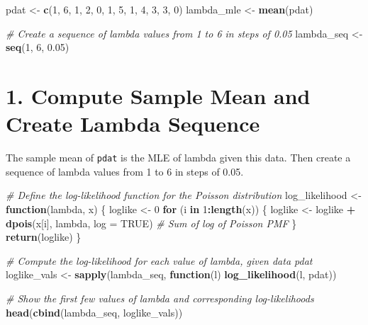 \documentclass[
]{article}
\newenvironment{Shaded}{\begin{snugshade}}{\end{snugshade}}
\newcommand{\AttributeTok}[1]{\textcolor[rgb]{0.13,0.29,0.53}{#1}}
\newcommand{\CommentTok}[1]{\textcolor[rgb]{0.56,0.35,0.01}{\textit{#1}}}
\newcommand{\ConstantTok}[1]{\textcolor[rgb]{0.56,0.35,0.01}{#1}}
\newcommand{\ControlFlowTok}[1]{\textcolor[rgb]{0.13,0.29,0.53}{\textbf{#1}}}
\newcommand{\DecValTok}[1]{\textcolor[rgb]{0.00,0.00,0.81}{#1}}
\newcommand{\FloatTok}[1]{\textcolor[rgb]{0.00,0.00,0.81}{#1}}
\newcommand{\FunctionTok}[1]{\textcolor[rgb]{0.13,0.29,0.53}{\textbf{#1}}}
\newcommand{\NormalTok}[1]{#1}
\newcommand{\OtherTok}[1]{\textcolor[rgb]{0.56,0.35,0.01}{#1}}
\newcommand{\SpecialCharTok}[1]{\textcolor[rgb]{0.81,0.36,0.00}{\textbf{#1}}}
\begin{document}
\begin{Shaded}
\begin{Highlighting}[]
\NormalTok{pdat }\OtherTok{\textless{}{-}} \FunctionTok{c}\NormalTok{(}\DecValTok{1}\NormalTok{, }\DecValTok{6}\NormalTok{, }\DecValTok{1}\NormalTok{, }\DecValTok{2}\NormalTok{, }\DecValTok{0}\NormalTok{, }\DecValTok{1}\NormalTok{, }\DecValTok{5}\NormalTok{, }\DecValTok{1}\NormalTok{, }\DecValTok{4}\NormalTok{, }\DecValTok{3}\NormalTok{, }\DecValTok{3}\NormalTok{, }\DecValTok{0}\NormalTok{)}
\NormalTok{lambda\_mle }\OtherTok{\textless{}{-}} \FunctionTok{mean}\NormalTok{(pdat)}

\CommentTok{\# Create a sequence of lambda values from 1 to 6 in steps of 0.05}
\NormalTok{lambda\_seq }\OtherTok{\textless{}{-}} \FunctionTok{seq}\NormalTok{(}\DecValTok{1}\NormalTok{, }\DecValTok{6}\NormalTok{, }\FloatTok{0.05}\NormalTok{)}
\end{Highlighting}
\end{Shaded}

\hypertarget{compute-sample-mean-and-create-lambda-sequence}{%
\section{1. Compute Sample Mean and Create Lambda
Sequence}\label{compute-sample-mean-and-create-lambda-sequence}}

The sample mean of \texttt{pdat} is the MLE of lambda given this data.
Then create a sequence of lambda values from 1 to 6 in steps of 0.05.

\begin{Shaded}
\begin{Highlighting}[]
\CommentTok{\# Define the log{-}likelihood function for the Poisson distribution}
\NormalTok{log\_likelihood }\OtherTok{\textless{}{-}} \ControlFlowTok{function}\NormalTok{(lambda, x) \{}
\NormalTok{  loglike }\OtherTok{\textless{}{-}} \DecValTok{0}
  \ControlFlowTok{for}\NormalTok{ (i }\ControlFlowTok{in} \DecValTok{1}\SpecialCharTok{:}\FunctionTok{length}\NormalTok{(x)) \{}
\NormalTok{    loglike }\OtherTok{\textless{}{-}}\NormalTok{ loglike }\SpecialCharTok{+} \FunctionTok{dpois}\NormalTok{(x[i], lambda, }\AttributeTok{log =} \ConstantTok{TRUE}\NormalTok{)  }\CommentTok{\# Sum of log of Poisson PMF}
\NormalTok{  \}}
  \FunctionTok{return}\NormalTok{(loglike)}
\NormalTok{\}}

\CommentTok{\# Compute the log{-}likelihood for each value of lambda, given data \textasciigrave{}pdat\textasciigrave{}}
\NormalTok{loglike\_vals }\OtherTok{\textless{}{-}} \FunctionTok{sapply}\NormalTok{(lambda\_seq, }\ControlFlowTok{function}\NormalTok{(l) }\FunctionTok{log\_likelihood}\NormalTok{(l, pdat))}

\CommentTok{\# Show the first few values of lambda and corresponding log{-}likelihoods}
\FunctionTok{head}\NormalTok{(}\FunctionTok{cbind}\NormalTok{(lambda\_seq, loglike\_vals))}
\end{Highlighting}
\end{Shaded}
\end{document}
